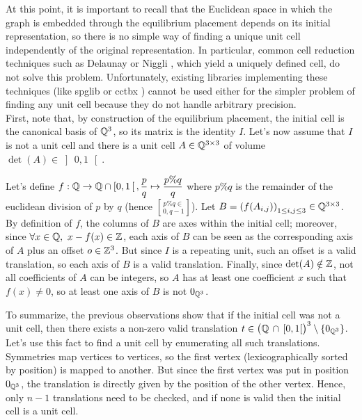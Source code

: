 \documentclass[main.tex]{subfiles}
\begin{document}
At this point, it is important to recall that the Euclidean space in which the graph is embedded through the equilibrium placement depends on its initial representation, so there is no simple way of finding a unique unit cell independently of the original representation. In particular, common cell reduction techniques such as Delaunay \autocite{Delaunay} or Niggli \autocite{Niggli, reducedCell}, which yield a uniquely defined cell, do not solve this problem. Unfortunately, existing libraries implementing these techniques (like spglib \autocite{spglib} or cctbx \autocite{cctbx}) cannot be used either for the simpler problem of finding any unit cell because they do not handle arbitrary precision.
\\

First, note that, by construction of the equilibrium placement, the initial cell is the canonical basis of $\mathbb{Q}^3$, so its matrix is the identity $I$. Let's now assume that $I$ is not a unit cell and there is a unit cell $A\in\mathbb{Q}^{3\times3}$ of volume $\det(A)\in\left]\,0,1\,\right[$.

Let's define $f:\mathbb{Q}\to\mathbb{Q}\cap\left[0,1\,\right[, \displaystyle\frac pq\mapsto\frac{p\%q}q$ where $p\%q$ is the remainder of the euclidean division of $p$ by $q$ (hence $p\%q\in\brack{0,q-1}$). Let $B = \left(f(A_{i,j})\right)_{1\le i,j\le3}\in\mathbb{Q}^{3\times3}$. By definition of $f$, the columns of $B$ are axes within the initial cell; moreover, since $\forall x\in\mathbb{Q},\ x-f(x)\in\mathbb{Z}$, each axis of $B$ can be seen as the corresponding axis of $A$ plus an offset $o\in\mathbb{Z}^3$. But since $I$ is a repeating unit, such an offset is a valid translation, so each axis of $B$ is a valid translation. Finally, since $\det(A)\notin\mathbb{Z}$, not all coefficients of $A$ can be integers, so $A$ has at least one coefficient $x$ such that $f(x)\ne0$, so at least one axis of $B$ is not $0_{\mathbb{Q}^3}$.

To summarize, the previous observations show that if the initial cell was not a unit cell, then there exists a non-zero valid translation $t\in\big(\mathbb{Q}\,\cap\,[0,1[\big)^3\setminus\{0_{\mathbb{Q}^3}\}$.\\

Let's use this fact to find a unit cell by enumerating all such translations. Symmetries map vertices to vertices, so the first vertex (lexicographically sorted by position) is mapped to another. But since the first vertex was put in position $0_{\mathbb{Q}^3}$, the translation is directly given by the position of the other vertex. Hence, only $n-1$ translations need to be checked, and if none is valid then the initial cell is a unit cell.
\end{document}
